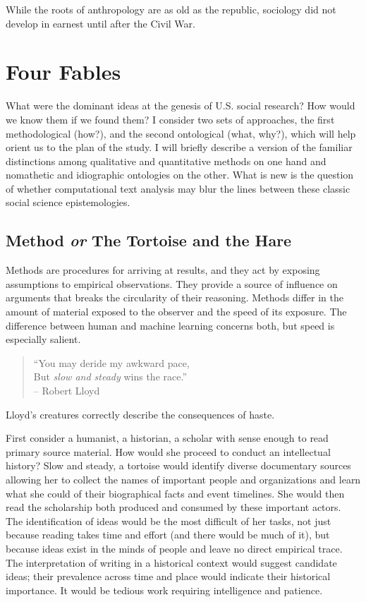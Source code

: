 \documentclass[]{book}
\begin{document}
While the roots of anthropology are as old as the republic, sociology
did not develop in earnest until after the Civil War.

\chapter{Four Fables}\label{four-fables}

What were the dominant ideas at the genesis of U.S. social research? How
would we know them if we found them? I consider two sets of approaches,
the first methodological (how?), and the second ontological (what,
why?), which will help orient us to the plan of the study. I will
briefly describe a version of the familiar distinctions among
qualitative and quantitative methods on one hand and nomathetic and
idiographic ontologies on the other. What is new is the question of
whether computational text analysis may blur the lines between these
classic social science epistemologies.

\section{\texorpdfstring{Method \emph{or} The Tortoise and the
Hare}{Method or The Tortoise and the Hare}}\label{method-or-the-tortoise-and-the-hare}

Methods are procedures for arriving at results, and they act by exposing
assumptions to empirical observations. They provide a source of
influence on arguments that breaks the circularity of their reasoning.
Methods differ in the amount of material exposed to the observer and the
speed of its exposure. The difference between human and machine learning
concerns both, but speed is especially salient.

\begin{quote}
``You may deride my awkward pace,\\
But \emph{slow and steady} wins the race.''\\
-- Robert Lloyd \citeyearpar[38]{Lloyd1762Poems}
\end{quote}

Lloyd's creatures correctly describe the consequences of haste.

First consider a humanist, a historian, a scholar with sense enough to
read primary source material. How would she proceed to conduct an
intellectual history? Slow and steady, a tortoise would identify diverse
documentary sources allowing her to collect the names of important
people and organizations and learn what she could of their biographical
facts and event timelines. She would then read the scholarship both
produced and consumed by these important actors. The identification of
ideas would be the most difficult of her tasks, not just because reading
takes time and effort (and there would be much of it), but because ideas
exist in the minds of people and leave no direct empirical trace. The
interpretation of writing in a historical context would suggest
candidate ideas; their prevalence across time and place would indicate
their historical importance. It would be tedious work requiring
intelligence and patience.
\end{document}
